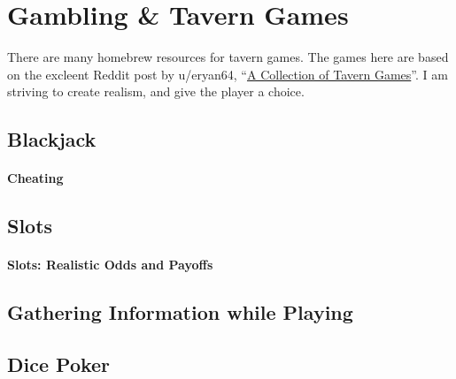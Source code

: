 \documentclass[twocolumn]{dndbook}
\begin{document}


\section{Gambling \& Tavern Games}

There are many homebrew resources for tavern games.
The games here are based on the excleent Reddit post by u/eryan64, ``\href{https://www.reddit.com/r/DnDBehindTheScreen/comments/fn6tng/a_collection_of_tavern_games/}{A Collection of Tavern Games}''.
I am striving to create realism, and give the player a choice.

\subsection{Blackjack}

\paragraph{Cheating}
\subsection{Slots}

\paragraph{Slots: Realistic Odds and Payoffs}

\subsection{Gathering Information while Playing}

\subsection{Dice Poker}
\end{document}
